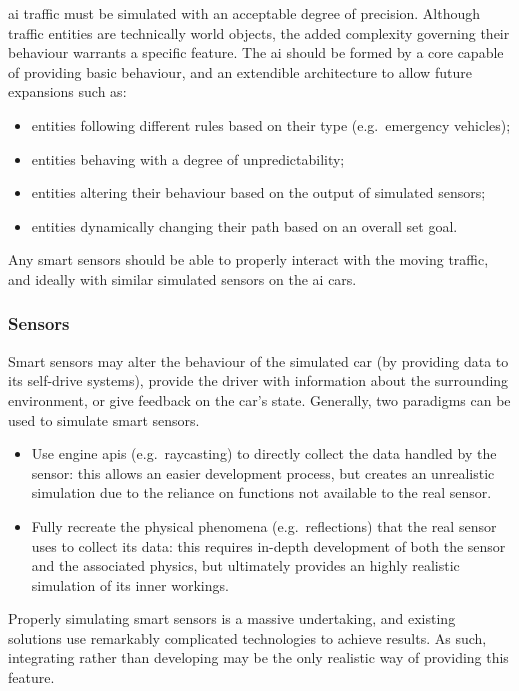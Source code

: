 \gls{ai} traffic must be simulated with an acceptable degree of precision. Although traffic entities are technically world objects, the added complexity governing their behaviour warrants a specific \gls{feature}. The \gls{ai} should be formed by a core capable of providing basic behaviour, and an extendible architecture to allow future expansions such as:

\begin{itemize}
	\item entities following different rules based on their type (e.g.\ emergency vehicles);
    \item entities behaving with a degree of unpredictability;
    \item entities altering their behaviour based on the output of simulated sensors;
    \item entities dynamically changing their path based on an overall set goal.
\end{itemize}

Any smart sensors should be able to properly interact with the moving traffic, and ideally with similar simulated sensors on the \gls{ai} cars.

\subsubsection{Sensors}

Smart sensors may alter the behaviour of the simulated car (by providing data to its self-drive systems), provide the driver with information about the surrounding environment, or give feedback on the car's state. Generally, two paradigms can be used to simulate smart sensors.

\begin{itemize}
	\item Use engine \glspl{api} (e.g.\ raycasting) to directly collect the data handled by the sensor: this allows an easier development process, but creates an unrealistic simulation due to the reliance on functions not available to the real sensor.
    \item Fully recreate the physical phenomena (e.g.\ reflections) that the real sensor uses to collect its data: this requires in-depth development of both the sensor and the associated physics, but ultimately provides an highly realistic simulation of its inner workings.
\end{itemize}

Properly simulating smart sensors is a massive undertaking, and existing solutions use remarkably complicated technologies to achieve results. As such, integrating rather than developing may be the only realistic way of providing this \gls{feature}.

